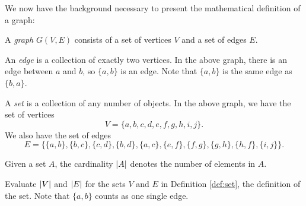 \documentclass[11pt]{article}
\begin{document}
We now have the background necessary to present the mathematical definition of a graph:

\begin{definition}
\label{def:graph}
A \textit{graph} $G(V,E)$ consists of a set of vertices $V$ and a set of edges $E$. 

\begin{center}
\end{center}
\end{definition}

\begin{definition}
\label{def:edge}
An \textit{edge} is a collection of exactly two vertices. In the above graph, there is an edge
between $a$ and $b$, so $\{a, b\}$ is an edge. Note that $\{a,b\}$ is the same edge as $\{b,a\}$.
\end{definition}

\begin{definition}
\label{def:set}
A \textit{set} is a collection of any number of objects. In the above graph, we have the set of vertices
\[V=\{a, b, c, d, e, f, g, h, i, j\}.\]
We also have the set of edges
\[E=\{\{a,b\}, \{b,c\}, \{c,d\},\{b,d\},\{a,c\},\{e,f\},\{f,g\},\{g,h\},\{h,f\},\{i,j\} \}.\]
\end{definition}

\begin{definition}
\label{def:cardinality}
Given a set $A$, the cardinality $\left\lvert A \right\rvert$ denotes the number of elements in $A$.
\end{definition}

\begin{problem} %
Evaluate $\left\lvert V \right\rvert$ and $\left\lvert E \right\rvert$ for the sets $V$ and $E$ in Definition \ref{def:set}, the definition of the set.
Note that $\{a,b\}$ counts as one single edge.
\end{problem}
\end{document}
